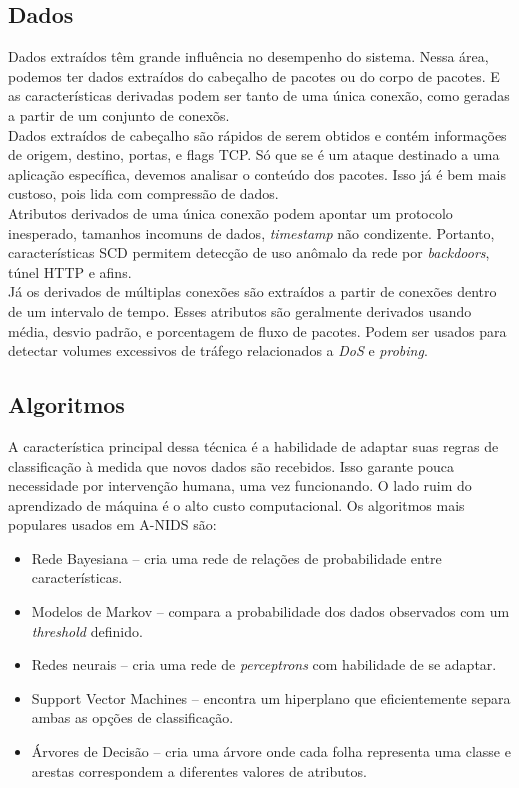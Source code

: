 \documentclass[12pt,a4paper]{article}
\begin{document}
    \subsection{Dados}
    Dados extraídos têm grande influência no desempenho do sistema. Nessa área, podemos ter dados extraídos do cabeçalho
    de pacotes ou do corpo de pacotes. E as características derivadas podem ser tanto de uma única conexão, como
    geradas a partir de um conjunto de conexõs. \\
    Dados extraídos de cabeçalho são rápidos de serem obtidos e contém informações de origem, destino, portas, e flags
    TCP. Só que se é um ataque destinado a uma aplicação específica, devemos analisar o conteúdo dos pacotes.
    Isso já é bem mais custoso, pois lida com compressão de dados. \\
    Atributos derivados de uma única conexão podem apontar um protocolo inesperado, tamanhos incomuns de dados,
    \emph{timestamp} não condizente. Portanto, características SCD permitem detecção de uso anômalo da rede
    por \textit{backdoors}, túnel HTTP e afins.\\
    Já os derivados de múltiplas conexões são extraídos a partir de conexões dentro de um intervalo de tempo.
    Esses atributos são geralmente derivados usando média, desvio padrão, e porcentagem de fluxo de pacotes.
    Podem ser usados para detectar volumes excessivos de tráfego relacionados a \textit{DoS} e \textit{probing}.


    \subsection{Algoritmos}
    A característica principal dessa técnica é a habilidade de adaptar suas regras de classificação à medida que
    novos dados são recebidos. Isso garante pouca necessidade por intervenção humana, uma vez funcionando. O lado ruim
    do aprendizado de máquina é o alto custo computacional. Os algoritmos mais populares usados em A-NIDS são:
    \begin{itemize}
        \item Rede Bayesiana -- cria uma rede de relações de probabilidade entre características.
        \item Modelos de Markov -- compara a probabilidade dos dados observados com um \emph{threshold} definido.
        \item Redes neurais -- cria uma rede de \emph{perceptrons} com habilidade de se adaptar.
        \item Support Vector Machines -- encontra um hiperplano que eficientemente separa ambas as opções de classificação.
        \item Árvores de Decisão -- cria uma árvore onde cada folha representa uma classe e arestas correspondem a
            diferentes valores de atributos.
    \end{itemize}
\end{document}
